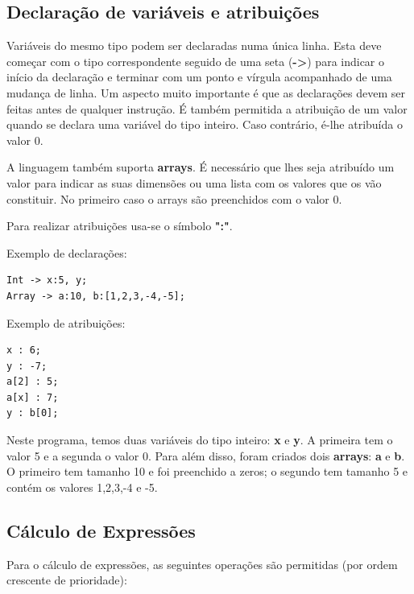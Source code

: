 \documentclass{article}
\begin{document}


\subsection{Declaração de variáveis e atribuições}
\setlength{\parindent}{5ex} Variáveis do mesmo tipo podem ser declaradas numa única linha. Esta deve começar com o tipo correspondente seguido de uma seta (\textbf{-\textgreater}) para indicar o início da declaração e terminar com um ponto e vírgula acompanhado de uma mudança de linha. Um aspecto muito importante é que as declarações devem ser feitas antes de qualquer instrução. É também permitida a atribuição de um valor quando se declara uma variável do tipo inteiro. Caso contrário, é-lhe atribuída o valor 0.
\par A linguagem também suporta \textbf{arrays}. É necessário que lhes seja atribuído um valor para indicar as suas dimensões ou uma lista com os valores que os vão constituir. No primeiro caso o arrays são preenchidos com o valor 0.
\par Para realizar atribuições usa-se o símbolo \textbf{":"}.

\par Exemplo de declarações:
\begin{lstlisting}[firstnumber=0]
Int -> x:5, y;
Array -> a:10, b:[1,2,3,-4,-5];
\end{lstlisting}

\par Exemplo de atribuições:
\begin{lstlisting}[firstnumber=0]
x : 6;
y : -7;
a[2] : 5;
a[x] : 7;
y : b[0];
\end{lstlisting}

\par Neste programa, temos duas variáveis do tipo inteiro: \textbf{x} e \textbf{y}. A primeira tem o valor 5 e a segunda o valor 0.
Para além disso, foram criados dois \textbf{arrays}: \textbf{a} e \textbf{b}. O primeiro tem tamanho 10 e foi preenchido a zeros; o segundo tem tamanho 5 e contém os valores 1,2,3,-4 e -5.




\subsection{Cálculo de Expressões}
\setlength{\parindent}{5ex} Para o cálculo de expressões, as seguintes operações são permitidas (por ordem crescente de prioridade):
\end{document}
